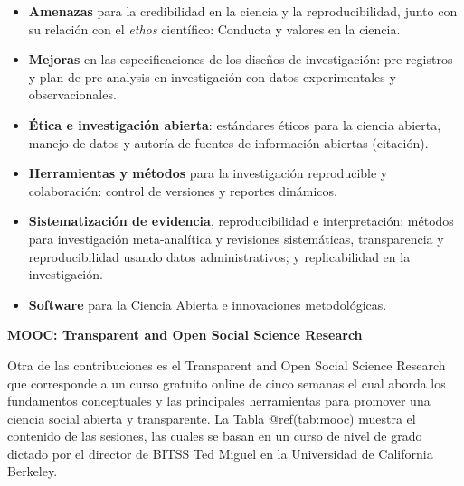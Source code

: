 \documentclass[
  spanish,
  letterpaper,
  DIV=11,
  numbers=noendperiod]{scrreprt}
\begin{document}
\begin{itemize}
\item
  \textbf{Amenazas} para la credibilidad en la ciencia y la
  reproducibilidad, junto con su relación con el \emph{ethos}
  científico: Conducta y valores en la ciencia.
\item
  \textbf{Mejoras} en las especificaciones de los diseños de
  investigación: pre-registros y plan de pre-analysis en investigación
  con datos experimentales y observacionales.
\item
  \textbf{Ética e investigación abierta}: estándares éticos para la
  ciencia abierta, manejo de datos y autoría de fuentes de información
  abiertas (citación).
\item
  \textbf{Herramientas y métodos} para la investigación reproducible y
  colaboración: control de versiones y reportes dinámicos.
\item
  \textbf{Sistematización de evidencia}, reproducibilidad e
  interpretación: métodos para investigación meta-analítica y revisiones
  sistemáticas, transparencia y reproducibilidad usando datos
  administrativos; y replicabilidad en la investigación.
\item
  \textbf{Software} para la Ciencia Abierta e innovaciones
  metodológicas.
\end{itemize}

\textbf{MOOC: Transparent and Open Social Science Research}

Otra de las contribuciones es el Transparent and Open Social Science
Research que corresponde a un curso gratuito online de cinco semanas el
cual aborda los fundamentos conceptuales y las principales herramientas
para promover una ciencia social abierta y transparente. La Tabla
@ref(tab:mooc) muestra el contenido de las sesiones, las cuales se basan
en un curso de nivel de grado dictado por el director de BITSS Ted
Miguel en la Universidad de California Berkeley.
\end{document}
